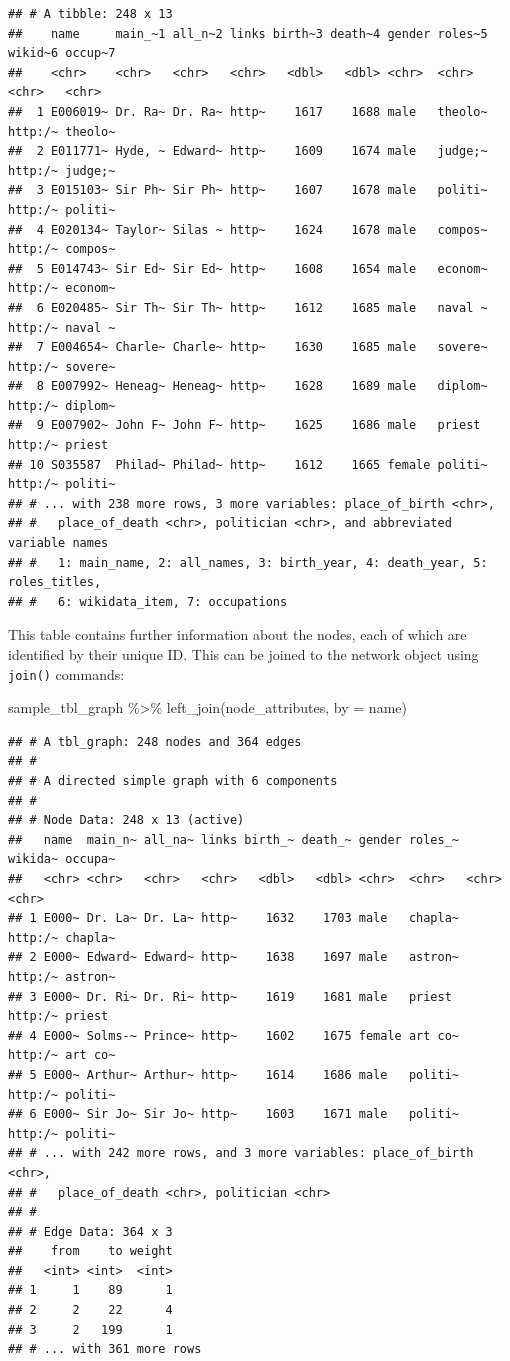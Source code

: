\documentclass[
]{book}
\newenvironment{Shaded}{\begin{snugshade}}{\end{snugshade}}
\newcommand{\AttributeTok}[1]{\textcolor[rgb]{0.77,0.63,0.00}{#1}}
\newcommand{\FunctionTok}[1]{\textcolor[rgb]{0.00,0.00,0.00}{#1}}
\newcommand{\NormalTok}[1]{#1}
\newcommand{\SpecialCharTok}[1]{\textcolor[rgb]{0.00,0.00,0.00}{#1}}
\newcommand{\StringTok}[1]{\textcolor[rgb]{0.31,0.60,0.02}{#1}}
\begin{document}
\begin{verbatim}
## # A tibble: 248 x 13
##    name     main_~1 all_n~2 links birth~3 death~4 gender roles~5 wikid~6 occup~7
##    <chr>    <chr>   <chr>   <chr>   <dbl>   <dbl> <chr>  <chr>   <chr>   <chr>  
##  1 E006019~ Dr. Ra~ Dr. Ra~ http~    1617    1688 male   theolo~ http:/~ theolo~
##  2 E011771~ Hyde, ~ Edward~ http~    1609    1674 male   judge;~ http:/~ judge;~
##  3 E015103~ Sir Ph~ Sir Ph~ http~    1607    1678 male   politi~ http:/~ politi~
##  4 E020134~ Taylor~ Silas ~ http~    1624    1678 male   compos~ http:/~ compos~
##  5 E014743~ Sir Ed~ Sir Ed~ http~    1608    1654 male   econom~ http:/~ econom~
##  6 E020485~ Sir Th~ Sir Th~ http~    1612    1685 male   naval ~ http:/~ naval ~
##  7 E004654~ Charle~ Charle~ http~    1630    1685 male   sovere~ http:/~ sovere~
##  8 E007992~ Heneag~ Heneag~ http~    1628    1689 male   diplom~ http:/~ diplom~
##  9 E007902~ John F~ John F~ http~    1625    1686 male   priest  http:/~ priest 
## 10 S035587  Philad~ Philad~ http~    1612    1665 female politi~ http:/~ politi~
## # ... with 238 more rows, 3 more variables: place_of_birth <chr>,
## #   place_of_death <chr>, politician <chr>, and abbreviated variable names
## #   1: main_name, 2: all_names, 3: birth_year, 4: death_year, 5: roles_titles,
## #   6: wikidata_item, 7: occupations
\end{verbatim}

This table contains further information about the nodes, each of which are identified by their unique ID. This can be joined to the network object using \texttt{join()} commands:

\begin{Shaded}
\begin{Highlighting}[]
\NormalTok{sample\_tbl\_graph }\SpecialCharTok{\%\textgreater{}\%} 
  \FunctionTok{left\_join}\NormalTok{(node\_attributes, }\AttributeTok{by =} \StringTok{\textquotesingle{}name\textquotesingle{}}\NormalTok{)}
\end{Highlighting}
\end{Shaded}

\begin{verbatim}
## # A tbl_graph: 248 nodes and 364 edges
## #
## # A directed simple graph with 6 components
## #
## # Node Data: 248 x 13 (active)
##   name  main_n~ all_na~ links birth_~ death_~ gender roles_~ wikida~ occupa~
##   <chr> <chr>   <chr>   <chr>   <dbl>   <dbl> <chr>  <chr>   <chr>   <chr>  
## 1 E000~ Dr. La~ Dr. La~ http~    1632    1703 male   chapla~ http:/~ chapla~
## 2 E000~ Edward~ Edward~ http~    1638    1697 male   astron~ http:/~ astron~
## 3 E000~ Dr. Ri~ Dr. Ri~ http~    1619    1681 male   priest  http:/~ priest 
## 4 E000~ Solms-~ Prince~ http~    1602    1675 female art co~ http:/~ art co~
## 5 E000~ Arthur~ Arthur~ http~    1614    1686 male   politi~ http:/~ politi~
## 6 E000~ Sir Jo~ Sir Jo~ http~    1603    1671 male   politi~ http:/~ politi~
## # ... with 242 more rows, and 3 more variables: place_of_birth <chr>,
## #   place_of_death <chr>, politician <chr>
## #
## # Edge Data: 364 x 3
##    from    to weight
##   <int> <int>  <int>
## 1     1    89      1
## 2     2    22      4
## 3     2   199      1
## # ... with 361 more rows
\end{verbatim}
\end{document}
